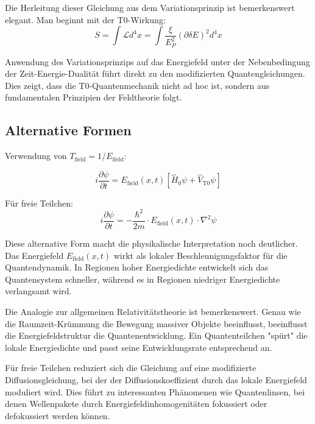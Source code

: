 \documentclass[12pt,a4paper]{article}
\newcommand{\deltaE}{\delta E}
\newcommand{\xipar}{\xi}
\newcommand{\EPlanck}{E_P}
\theoremstyle{definition}
\theoremstyle{remark}
\begin{document}
Die Herleitung dieser Gleichung aus dem Variationsprinzip ist bemerkenswert elegant. Man beginnt mit der T0-Wirkung:
$$S = \int \mathcal{L} d^4x = \int \frac{\xipar}{\EPlanck^2} (\partial \deltaE)^2 d^4x$$

Anwendung des Variationsprinzips auf das Energiefeld unter der Nebenbedingung der Zeit-Energie-Dualität führt direkt zu den modifizierten Quantengleichungen. Dies zeigt, dass die T0-Quantenmechanik nicht ad hoc ist, sondern aus fundamentalen Prinzipien der Feldtheorie folgt.

\subsection{Alternative Formen}

Verwendung von $T_{\text{field}} = 1/E_{\text{field}}$:

\begin{equation}
	\boxed{i \frac{\partial\psi}{\partial t} = E_{\text{field}}(x,t) \left[\hat{H}_0 \psi + \hat{V}_{\text{T0}} \psi\right]}
	\label{eq:t0_schrodinger_energy}
\end{equation}

Für freie Teilchen:
\begin{equation}
	\boxed{i \frac{\partial\psi}{\partial t} = -\frac{\hbar^2}{2m} \cdot E_{\text{field}}(x,t) \cdot \nabla^2 \psi}
	\label{eq:t0_schrodinger_free}
\end{equation}

Diese alternative Form macht die physikalische Interpretation noch deutlicher. Das Energiefeld $E_{\text{field}}(x,t)$ wirkt als lokaler Beschleunigungsfaktor für die Quantendynamik. In Regionen hoher Energiedichte entwickelt sich das Quantensystem schneller, während es in Regionen niedriger Energiedichte verlangsamt wird.

Die Analogie zur allgemeinen Relativitätstheorie ist bemerkenswert. Genau wie die Raumzeit-Krümmung die Bewegung massiver Objekte beeinflusst, beeinflusst die Energiefeldstruktur die Quantenentwicklung. Ein Quantenteilchen "spürt" die lokale Energiedichte und passt seine Entwicklungsrate entsprechend an.

Für freie Teilchen reduziert sich die Gleichung auf eine modifizierte Diffusionsgleichung, bei der der Diffusionskoeffizient durch das lokale Energiefeld moduliert wird. Dies führt zu interessanten Phänomenen wie Quantenlinsen, bei denen Wellenpakete durch Energiefeldinhomogenitäten fokussiert oder defokussiert werden können.
\end{document}
